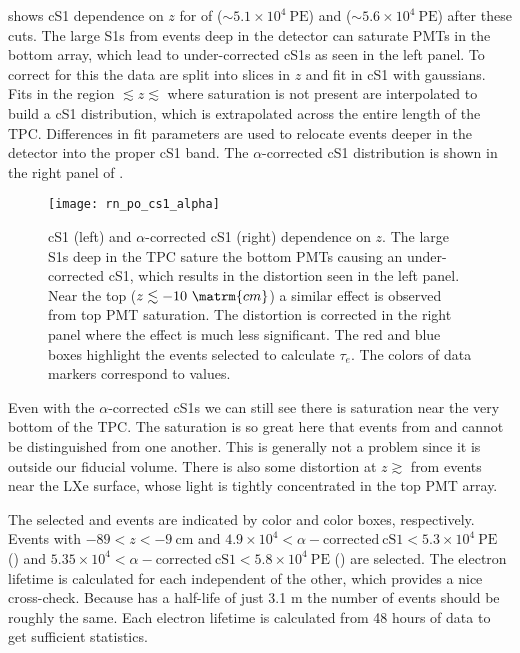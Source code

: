  shows cS1 dependence on $z$ for \alphadecays of 
(${\sim} 5.1 \times 10^4 \ \mathrm{PE}$) and  (${\sim} 5.6 \times 10^4\ \mathrm{PE}$) after these cuts.  The large
S1s from events deep in the detector can saturate PMTs in the bottom array, which lead to under-corrected cS1s as seen in the left
panel.  To correct for this the data are split into slices in $z$ and fit in cS1 with gaussians.  Fits in the region
$\lesssim z \lesssim$ where saturation is not present are interpolated to build a cS1 distribution, which is extrapolated across the
entire length of
the TPC.  Differences in fit parameters are used to relocate events deeper in the detector into the proper cS1 band.  The
$\alpha$-corrected cS1 distribution is shown in the right panel of .

\begin{figure}
\centering
\texttt{[image: rn\_po\_cs1\_alpha]}
\caption{cS1 (left) and $\alpha$-corrected cS1 (right) dependence on $z$.  The large \alphadecay S1s deep in
the TPC sature the bottom PMTs causing an under-corrected cS1, which
results in the distortion seen in the left panel.  Near the top ($z \lesssim -10\ \matrm{cm}$) a similar effect is observed from top PMT
saturation.  The distortion is corrected in the right panel where the effect is much less significant.  The red and blue boxes highlight
the events selected to calculate $\tau_e$.  The colors of data markers correspond to \stwob values.}
\label{fig:electron_lifetimes_measurement_alphas_s1}
\end{figure}

Even with the $\alpha$-corrected cS1s we can still see there is saturation near the very bottom of the TPC.  The saturation is so great
here that events from  and  cannot be distinguished from one another.  This is generally not a problem since it
is outside our fiducial volume.  There is also some distortion at $z \gtrsim$ from events
near the LXe surface, whose light is tightly concentrated in the top PMT array.

The selected  and  events are indicated by color and color boxes, respectively.  Events with
$-89< z < -9\ \mathrm{cm}$ and
$4.9 \times 10^4 < \alpha-\mathrm{corrected\ cS1} < 5.3 \times 10^4\ \mathrm{PE}$ () and
$5.35 \times 10^4 < \alpha-\mathrm{corrected\ cS1} < 5.8 \times 10^4\ \mathrm{PE}$ () are selected.  The electron lifetime is
calculated for each
independent of the other, which provides a nice cross-check.  Because  has a half-life of just 3.1 m the number of events
should be roughly the same.  Each electron lifetime is calculated from 48 hours of data to get sufficient statistics.

